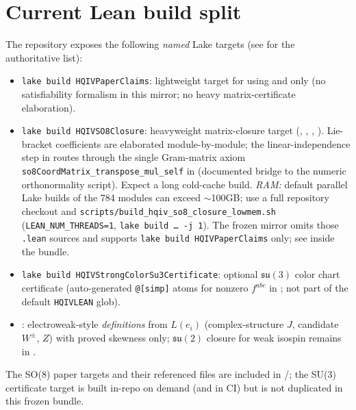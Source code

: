 \documentclass[11pt]{article}
\begin{document}
\section*{Current Lean build split}
\begin{sloppypar}
The repository exposes the following \emph{named} Lake targets (see  for the authoritative list):
\begin{itemize}
\item \texttt{lake build HQIVPaperClaims}: lightweight target for  using  and  only (no satisfiability formalism in this mirror; no heavy matrix-certificate elaboration).
\item \texttt{lake build HQIVSO8Closure}: heavyweight matrix-closure target (, , , ). Lie-bracket coefficients are elaborated module-by-module; the linear-independence step in  routes through the single Gram-matrix axiom \texttt{so8CoordMatrix\_transpose\_mul\_self} in  (documented bridge to the numeric orthonormality script). Expect a long cold-cache build. \emph{RAM:} default parallel Lake builds of the 784  modules can exceed \(\sim\)100GB; use a full repository checkout and \texttt{scripts/build\_hqiv\_so8\_closure\_lowmem.sh} (\texttt{LEAN\_NUM\_THREADS=1}, \texttt{lake build \ldots\ -j 1}). The frozen  mirror omits those \texttt{.lean} sources and supports \texttt{lake build HQIVPaperClaims} only; see  inside the bundle.
\item \texttt{lake build HQIVStrongColorSu3Certificate}: optional \(\mathfrak{su}(3)\) color chart certificate (auto-generated \texttt{@[simp]} atoms for nonzero \(f^{abc}\) in ; not part of the default \texttt{HQIVLEAN} glob).
\item {}: electroweak-style \emph{definitions} from $L(e_i)$ (complex-structure $J$, candidate $W^\pm$, $Z$) with proved skewness only; \(\mathfrak{su}(2)\) closure for weak isospin remains in .
\end{itemize}
The SO(8) paper targets and their referenced files are included in \PaperReproBundleDir/; the SU(3) certificate target is built in-repo on demand (and in CI) but is not duplicated in this frozen bundle.
\end{sloppypar}
\end{document}
